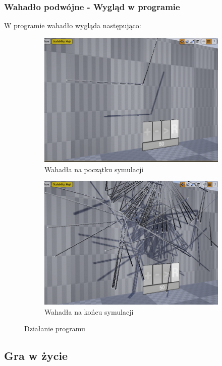\documentclass[a4paper,12pt,reqno]{article}
\begin{document}
\subsubsection{Wahadło podwójne - Wygląd w programie}
W programie wahadło wygląda następująco:


\begin{figure}[H]%
	\centering
	\begin{subfigure}{.5\textwidth}
		\centering
		\includegraphics[width=0.8\linewidth]{graphics/PendulumInUE_1.png}
		\caption{Wahadła na początku symulacji}	
		\label{ref:subref_a}
	\end{subfigure}%
	\begin{subfigure}{.5\textwidth}
		\centering
		\includegraphics[width=0.8\linewidth]{graphics/PendulumInUE_2.png}
		\caption{Wahadła na końcu symulacji}
		\label{ref:subref_b}
	\end{subfigure}%
	

\caption{Działanie programu}
\label{ref:ref}
\end{figure}

\subsection{Gra w życie}
\end{document}
